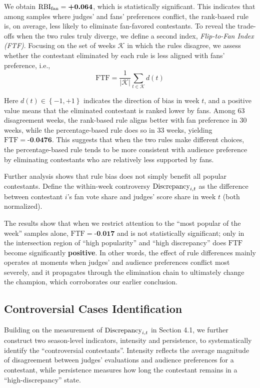 \documentclass[12pt]{article}
\begin{document}
We obtain ${\rm \operatorname{RBI}}_{\mathrm{fan}}=\textbf{+0.064}$, which is statistically significant. This indicates that among samples where judges' and fans' preferences conflict, the rank-based rule is, on average, less likely to eliminate fan-favored contestants. To reveal the trade-offs when the two rules truly diverge, we define a second index, \textit{Flip-to-Fan Index (FTF)}. Focusing on the set of weeks $\mathcal{K}$ in which the rules disagree, we assess whether the contestant eliminated by each rule is less aligned with fans' preference, i.e.,
\begin{equation}
  \mathrm{FTF}=\frac{1}{\left|\mathcal{K}\right|}\sum_{t\in\mathcal{K}} d\left(t\right)
\end{equation}

Here $d\left(t\right)\in\left\{-1,+1\right\}$ indicates the direction of bias in week $t$, and a positive value means that the eliminated contestant is ranked lower by fans. Among 63 disagreement weeks, the rank-based rule aligns better with fan preference in 30 weeks, while the percentage-based rule does so in 33 weeks, yielding $\mathrm{FTF}=\textbf{-0.0476}$. This suggests that when the two rules make different choices, the percentage-based rule tends to be more consistent with audience preference by eliminating contestants who are relatively less supported by fans.

Further analysis shows that rule bias does not simply benefit all popular contestants. Define the within-week controversy ${\rm Discrepancy}_{i,t}$ as the difference between contestant $i$'s fan vote share and judges' score share in week $t$ (both normalized). 

The results show that when we restrict attention to the ``most popular of the week'' samples alone, $\mathrm{FTF}=\textbf{-0.017}$ and is not statistically significant; only in the intersection region of ``high popularity'' and ``high discrepancy'' does $\mathrm{FTF}$ become significantly \textbf{positive}. In other words, the effect of rule differences mainly operates at moments when judges' and audience preferences conflict most severely, and it propagates through the elimination chain to ultimately change the champion, which corroborates our earlier conclusion.
\subsection{Controversial Cases Identification}

Building on the measurement of ${\rm Discrepancy}_{i,t}$ in Section 4.1, we further construct two season-level indicators, intensity and persistence, to systematically identify the ``controversial contestants''. Intensity reflects the average magnitude of disagreement between judges' evaluations and audience preferences for a contestant, while persistence measures how long the contestant remains in a ``high-discrepancy'' state.
\end{document}
